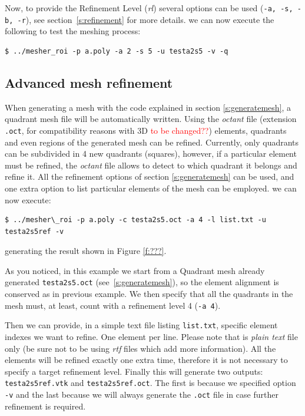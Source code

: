 \documentclass[10pt]{article}
\begin{document}
Now, to provide the Refinement Level (\textit{rl}) several options can be used (\texttt{-a, -s, -b, -r}), see section~\ref{s:refinement} for more details.
we can now execute the following to test the meshing process:
{\small
\begin{verbatim}
$ ../mesher_roi -p a.poly -a 2 -s 5 -u testa2s5 -v -q
\end{verbatim}
}
\subsection{Advanced mesh refinement}
\label{s:refinemesh}

When generating a mesh with the code explained in section \ref{s:generatemesh}, a quadrant mesh file will be automatically written. Using the \textit{octant} file (extension \texttt{.oct}, for compatibility reasons with 3D \textcolor{red}{to be changed??}) elements, quadrants and even regions of the generated mesh can be refined. Currently, only quadrants can be subdivided in 4 new quadrants (squares), however, if a particular element must be refined, the \textit{octant} file allows to detect to which quadrant it belongs and refine it. All the refinement options of section \ref{s:generatemesh} can be used, and one extra option to list particular elements of the mesh can be employed.
we can now execute: 
{\small
\begin{verbatim}
$ ../mesher\_roi -p a.poly -c testa2s5.oct -a 4 -l list.txt -u testa2s5ref -v
\end{verbatim}
}
generating the result shown in Figure \ref{f:???}.

As you noticed, in this example we start from a Quadrant mesh already generated \texttt{testa2s5.oct} (see~\ref{s:generatemesh}), so the element alignment is conserved as in previous example. We then specify that all the quadrants in the mesh must, at least, count with a refinement level 4 (\texttt{-a 4}). 

Then we can provide, in a simple text file listing \texttt{list.txt}, specific element indexes we want to refine. One element per line. Please note that is \textit{plain text} file only (be sure not to be using \textit{rtf} files which add more information).
All the elements will be refined exactly one extra time, therefore it is not necessary to specify a target refinement level. Finally this will generate two outputs: \texttt{testa2s5ref.vtk} and \texttt{testa2s5ref.oct}. The first is because we specified option \texttt{-v} and the last because we will always generate the \texttt{.oct} file in case further refinement is required. 
%
%
\end{document}
